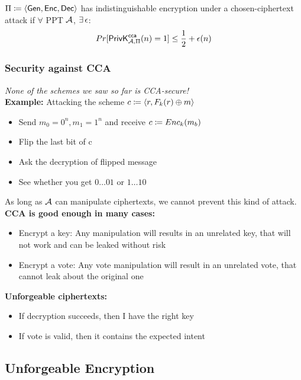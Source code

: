 \documentclass[12pt]{article}
\begin{document}
$\Pi \coloneqq \langle \operatorname{\mathsf{Gen}}, \operatorname{\mathsf{Enc}}, \operatorname{\mathsf{Dec}} \rangle$ has indistinguishable encryption under a chosen-ciphertext attack if $\forall$ PPT $\mathcal{A}$, $\exists\,\epsilon$:
\begin{equation*}
Pr[\mathsf{PrivK}_{\mathcal{A},\Pi}^\mathsf{cca}(n)=1] \le \frac12 + \epsilon(n)
\end{equation*}

\subsubsection{Security against CCA}
\emph{None of the schemes we saw so far is CCA-secure!}\\
\textbf{Example:} Attacking the scheme $c\coloneqq \langle r,F_k(r)\oplus m \rangle$
\begin{itemize}
\item Send $m_0 = 0^n, m_1=1^n$ and receive $c\coloneqq Enc_k(m_b)$
\item Flip the last bit of c
\item Ask the decryption of flipped message
\item See whether you get $0\dots01$ or $1\dots10$
\end{itemize}
As long as $\mathcal{A}$ can manipulate ciphertexts, we cannot prevent this kind of attack.
\textbf{CCA is good enough in many cases:}
\begin{itemize}
\item Encrypt a key: Any manipulation will results in an unrelated key, that will not work and can be leaked without risk
\item Encrypt a vote: Any vote manipulation will result in an unrelated vote, that cannot leak about the original one
\end{itemize}
\newpage
\textbf{Unforgeable ciphertexts:}
\begin{itemize}
\item If decryption succeeds, then I have the right key
\item If vote is valid, then it contains the expected intent
\end{itemize}

\subsection{Unforgeable Encryption}
\end{document}
